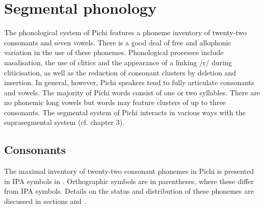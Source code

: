 \chapter{Segmental phonology}

The phonological system of Pichi features a phoneme inventory of twenty-two consonants and seven vowels. There is a good deal of free and allophonic variation in the use of these phonemes. Phonological processes include nasalisation, the use of clitics and the appearance of a linking /r/ during cliticisation, as well as the reduction of consonant clusters by deletion and insertion. In general, however, Pichi speakers tend to fully articulate consonants and vowels. The majority of Pichi words consist of one or two syllables. There are no phonemic long vowels but words may feature clusters of up to three consonants. The segmental system of Pichi interacts in various ways with the suprasegmental system (cf. chapter 3).

\section{Consonants}\label{sec:2.1}

The maximal inventory of twenty-two consonant phonemes in Pichi is presented in IPA symbols in . Orthographic symbols are in parentheses, where these differ from IPA symbols. Details on the status and distribution of these phonemes are discussed in sections  and .

